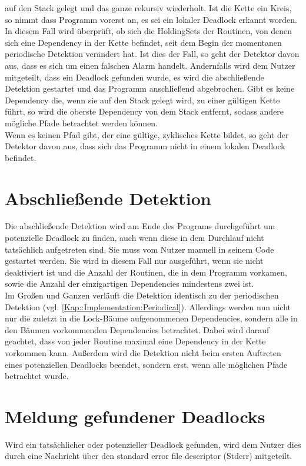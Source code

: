 auf den Stack gelegt und das ganze rekursiv wiederholt. Ist die Kette ein Kreis,
so nimmt dass Programm vorerst an, es sei ein lokaler Deadlock erkannt worden.
In diesem Fall wird überprüft, ob sich die HoldingSets der Routinen, von denen
sich eine Dependency in der Kette befindet, seit dem Begin der momentanen 
periodische Detektion verändert hat. Ist dies der Fall, so geht der Detektor
 davon aus, dass es sich um einen falschen Alarm handelt. Andernfalls 
wird dem Nutzer mitgeteilt, dass ein Deadlock gefunden wurde, es wird die 
abschließende Detektion gestartet und das Programm anschließend abgebrochen.
Gibt es keine Dependency die, wenn sie auf den Stack gelegt wird, zu einer 
gültigen Kette führt, so wird die oberste Dependency von dem Stack entfernt,
sodass andere mögliche Pfade betrachtet werden können.\\
Wenn es keinen Pfad gibt, der eine gültige, zyklisches Kette bildet, so geht 
der Detektor davon aus, dass sich das Programm nicht in einem lokalen Deadlock
befindet.

\section{Abschließende Detektion}
Die abschließende Detektion wird am Ende des Programs durchgeführt um 
potenzielle Deadlock zu finden, auch wenn diese in dem Durchlauf nicht 
tatsächlich aufgetreten sind. Sie muss vom Nutzer manuell in seinem Code 
gestartet werden. Sie wird in diesem Fall nur ausgeführt, wenn sie nicht 
deaktiviert ist und
 die Anzahl der Routinen, die in dem Programm vorkamen,
sowie die Anzahl der einzigartigen Dependencies mindestens zwei ist.\\
Im Großen und Ganzen verläuft die Detektion 
identisch zu der periodischen Detektion (vgl. \ref{Kap::Implementation:Periodical}).
Allerdings werden nun nicht nur die zuletzt in die Lock-Bäume aufgenommenen 
Dependencies, sondern alle in den Bäumen vorkommenden Dependencies betrachtet. 
Dabei wird darauf geachtet, dass von jeder Routine maximal eine 
Dependency in der Kette vorkommen kann. Außerdem wird die Detektion nicht beim 
ersten Auftreten eines potenziellen Deadlocks beendet, sondern erst, wenn alle 
möglichen Pfade betrachtet wurde.


\section{Meldung gefundener Deadlocks}\label{Kap::Implementation:Report}
Wird ein tatsächlicher oder potenzieller Deadlock gefunden, wird dem Nutzer 
dies durch eine Nachricht über den standard error file descriptor (Stderr)
mitgeteilt.
